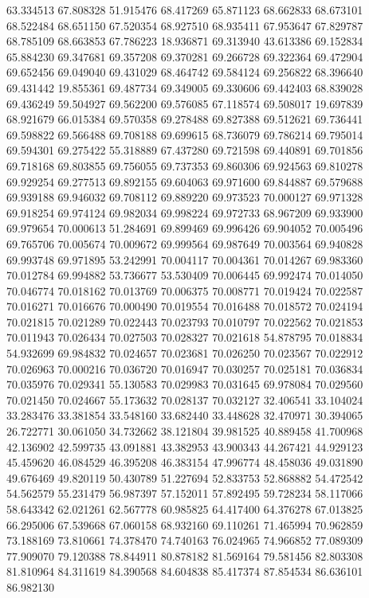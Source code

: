 63.334513
67.808328
51.915476
68.417269
65.871123
68.662833
68.673101
68.522484
68.651150
67.520354
68.927510
68.935411
67.953647
67.829787
68.785109
68.663853
67.786223
18.936871
69.313940
43.613386
69.152834
65.884230
69.347681
69.357208
69.370281
69.266728
69.322364
69.472904
69.652456
69.049040
69.431029
68.464742
69.584124
69.256822
68.396640
69.431442
19.855361
69.487734
69.349005
69.330606
69.442403
68.839028
69.436249
59.504927
69.562200
69.576085
67.118574
69.508017
19.697839
68.921679
66.015384
69.570358
69.278488
69.827388
69.512621
69.736441
69.598822
69.566488
69.708188
69.699615
68.736079
69.786214
69.795014
69.594301
69.275422
55.318889
67.437280
69.721598
69.440891
69.701856
69.718168
69.803855
69.756055
69.737353
69.860306
69.924563
69.810278
69.929254
69.277513
69.892155
69.604063
69.971600
69.844887
69.579688
69.939188
69.946032
69.708112
69.889220
69.973523
70.000127
69.971328
69.918254
69.974124
69.982034
69.998224
69.972733
68.967209
69.933900
69.979654
70.000613
51.284691
69.899469
69.996426
69.904052
70.005496
69.765706
70.005674
70.009672
69.999564
69.987649
70.003564
69.940828
69.993748
69.971895
53.242991
70.004117
70.004361
70.014267
69.983360
70.012784
69.994882
53.736677
53.530409
70.006445
69.992474
70.014050
70.046774
70.018162
70.013769
70.006375
70.008771
70.019424
70.022587
70.016271
70.016676
70.000490
70.019554
70.016488
70.018572
70.024194
70.021815
70.021289
70.022443
70.023793
70.010797
70.022562
70.021853
70.011943
70.026434
70.027503
70.028327
70.021618
54.878795
70.018834
54.932699
69.984832
70.024657
70.023681
70.026250
70.023567
70.022912
70.026963
70.000216
70.036720
70.016947
70.030257
70.025181
70.036834
70.035976
70.029341
55.130583
70.029983
70.031645
69.978084
70.029560
70.021450
70.024667
55.173632
70.028137
70.032127
32.406541
33.104024
33.283476
33.381854
33.548160
33.682440
33.448628
32.470971
30.394065
26.722771
30.061050
34.732662
38.121804
39.981525
40.889458
41.700968
42.136902
42.599735
43.091881
43.382953
43.900343
44.267421
44.929123
45.459620
46.084529
46.395208
46.383154
47.996774
48.458036
49.031890
49.676469
49.820119
50.430789
51.227694
52.833753
52.868882
54.472542
54.562579
55.231479
56.987397
57.152011
57.892495
59.728234
58.117066
58.643342
62.021261
62.567778
60.985825
64.417400
64.376278
67.013825
66.295006
67.539668
67.060158
68.932160
69.110261
71.465994
70.962859
73.188169
73.810661
74.378470
74.740163
76.024965
74.966852
77.089309
77.909070
79.120388
78.844911
80.878182
81.569164
79.581456
82.803308
81.810964
84.311619
84.390568
84.604838
85.417374
87.854534
86.636101
86.982130
